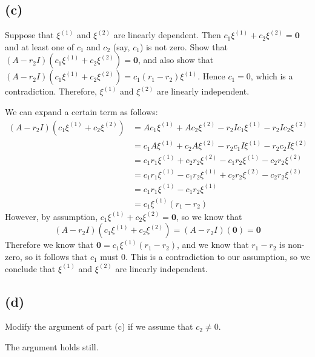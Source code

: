 \documentclass{article}
\theoremstyle{definition}
\begin{document}
    \subsection*{(c)}
        \begin{mdframed}[]
            Suppose that $\xi^{(1)}$ and $\xi^{(2)}$ are linearly dependent.
            Then $c_1 \xi^{(1)} + c_2 \xi^{(2)} = \bm 0$ and at least one 
            of $c_1$ and $c_2$ (say, $c_1$) is not zero. Show that 
            $(A - r_2I)(c_1 \xi^{(1)} + c_2 \xi^{(2)}) = \bm 0$, and also 
            show that $(A - r_2I)(c_1 \xi^{(1)} + c_2\xi^{(2)}) = c_1(r_1 - r_2)\xi^{(1)}$.
            Hence $c_1 = 0$, which is a contradiction. Therefore, $\xi^{(1)}$ and $\xi^{(2)}$ are 
            linearly independent.
        \end{mdframed}
        We can expand a certain term as follows:
        \begin{align*}
            (A - r_2I)(c_1 \xi^{(1)} + c_2\xi^{(2)}) &= Ac_1\xi^{(1)} + Ac_2\xi^{(2)} -r_2 I c_1 \xi^{(1)} - r_2 I c_2 \xi^{(2)} \\
            &=c_1 A\xi^{(1)} + c_2A\xi^{(2)} - r_2 c_1 I \xi^{(1)} - r_2 c_2 I \xi^{(2)} \\
            &= c_1 r_1 \xi^{(1)} + c_2 r_2 \xi^{(2)} - c_1 r_2 \xi^{(1)} - c_2 r_2 \xi^{(2)} \\
            &= c_1 r_1 \xi^{(1)}  - c_1 r_2 \xi^{(1)} + c_2 r_2 \xi^{(2)} - c_2 r_2 \xi^{(2)} \\
            &= c_1 r_1 \xi^{(1)}  - c_1 r_2 \xi^{(1)} \\
            &= c_1\xi^{(1)}(r_1 - r_2)
        \end{align*}
        However, by assumption, $c_1 \xi^{(1)} + c_2 \xi^{(2)} = \bm 0$, so we know that
        \[
            (A - r_2I)(c_1 \xi^{(1)} + c_2 \xi^{(2)}) = (A - r_2I)(\bm 0) = \bm 0
        \]
        Therefore we know that $\bm 0 = c_1 \xi^{(1)}(r_1 - r_2)$, and we know that $r_1 - r_2$ is non-zero, so it follows 
        that $c_1$ must 0. This is a contradiction to our assumption, so we conclude that $\xi^{(1)}$ and $\xi^{(2)}$ are
        linearly independent.
    \subsection*{(d)}
        \begin{mdframed}[]
            Modify the argument of part (c) if we assume that $c_2 \neq 0$.
        \end{mdframed}
        The argument holds still.
\end{document}
